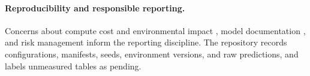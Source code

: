 \paragraph{Reproducibility and responsible reporting.}
Concerns about compute cost and environmental impact
\citep{schwartz2019green}, model documentation \citep{mitchell2019modelcards},
and risk management \citep{nist2023airmf} inform the reporting discipline.
The repository records configurations, manifests, seeds, environment versions,
and raw predictions, and labels unmeasured tables as pending.
